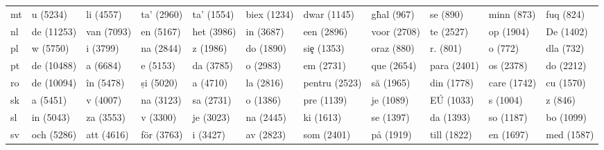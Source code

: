 \begin{tabular}{l|llllllllll}
mt	&u (5234)	&li (4557)	&ta' (2960)	&ta’ (1554)	&biex (1234)	&dwar (1145)	&g\`hal (967)	&se (890)	&minn (873)	&fuq (824)\\
nl	&de (11253)	&van (7093)	&en (5167)	&het (3986)	&in (3687)	&een (2896)	&voor (2708)	&te (2527)	&op (1904)	&De (1402)\\
pl	&w (5750)	&i (3799)	&na (2844)	&z (1986)	&do (1890)	&si\c e (1353)	&oraz (880)	&r. (801)	&o (772)	&dla (732)\\
pt	&de (10488)	&a (6684)	&e (5153)	&da (3785)	&o (2983)	&em (2731)	&que (2654)	&para (2401)	&os (2378)	&do (2212)\\
ro	&de (10094)	&în (5478)	&și (5020)	&a (4710)	&la (2816)	&pentru (2523)	&să (1965)	&din (1778)	&care (1742)	&cu (1570)\\
sk	&a (5451)	&v (4007)	&na (3123)	&sa (2731)	&o (1386)	&pre (1139)	&je (1089)	&EÚ (1033)	&s (1004)	&z (846)\\
sl	&in (5043)	&za (3553)	&v (3300)	&je (3023)	&na (2445)	&ki (1613)	&se (1397)	&da (1393)	&so (1187)	&bo (1099)\\
sv	&och (5286)	&att (4616)	&för (3763)	&i (3427)	&av (2823)	&som (2401)	&på (1919)	&till (1822)	&en (1697)	&med (1587)\\
\end{tabular}

